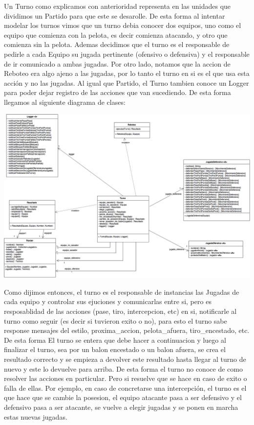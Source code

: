 Un Turno como explicamos con anterioridad representa en las unidades que dividimos un Partido para que este se desarolle. De esta forma al intentar modelar los turnos vimos que un turno debia conocer dos equipos, uno como el equipo que comienza con la pelota, es decir comienza atacando, y otro que comienza sin la pelota. Ademas decidimos que el turno es el responsable de pedirle a cada Equipo su jugada pertinente (ofensivo o defensiva) y el responsable de ir comunicado a ambas jugadas.
Por otro lado, notamos que la accion de Reboteo era algo ajeno a las jugadas, por lo tanto el turno en si es el que usa esta acción y no las jugadas.
Al igual que Partido, el Turno tambien conoce un Logger para poder dejar registro de las acciones que van sucediendo.
De esta forma llegamos al siguiente diagrama de clases:

\begin{center}
  \includegraphics[scale=0.35]{imagenes/clases-turno.png}
\end{center}

Como dijimos entonces, el turno es el responsable de instancias las Jugadas de cada equipo y controlar sus ejuciones y comunicarlas entre si, pero es resposablidad de las acciones (pase, tiro, intercepcion, etc) en si, notificarle al turno como seguir (es decir si tuvieron exito o no), para esto el turno sabe response mensajes del estilo, proxima_accion, pelota_afuera, tiro_encestado, etc. De esta forma El turno se entera que debe hacer a continuacion y luego al finalizar el turno, sea por un balon encestado o un balon afuera, se crea el resultado correcto y se empieza a devolver este resultado hasta llegar al turno de nuevo y este lo devuelve para arriba.
De esta forma el turno no conoce de como resolver las acciones en particular. Pero si resuelve que se hace en caso de exito o falla de ellas. Por ejemplo, en caso de concretarse una intercepción, el turno es el que hace que se cambie la posesion, el equipo atacante pasa a ser defensivo y el defensivo pasa a ser atacante, se vuelve a elegir jugadas y se ponen en marcha estas nuevas jugadas.


